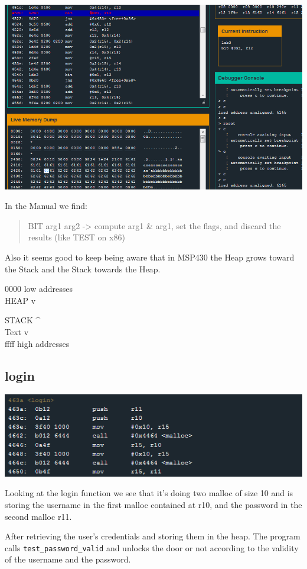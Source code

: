 \includegraphics{img/14_2.PNG}

In the Manual we find:

\begin{quote}
BIT arg1 arg2 -\textgreater{} compute arg1 \& arg1, set the flags, and
discard the results (like TEST on x86)
\end{quote}

Also it seems good to keep being aware that in MSP430 the Heap grows
toward the Stack and the Stack towards the Heap.

0000 low addresses\\HEAP v

STACK \^{}\\Text v\\ffff high addresses

\subsection{login}\label{login}

\includegraphics{img/14_3.PNG}

Looking at the login function we see that it's doing two malloc of size
10 and is storing the username in the first malloc contained at r10, and
the password in the second malloc r11.

After retrieving the user's credentials and storing them in the heap.
The program calls \texttt{test\_password\_valid} and unlocks the door or
not according to the validity of the username and the password.

